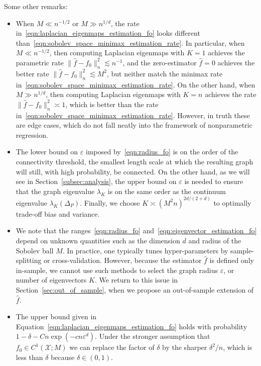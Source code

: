\documentclass{article}
\newcommand{\1}{\mathbf{1}}
\newcommand{\mc}[1]{\mathcal{#1}}
\newcommand{\wh}[1]{\widehat{#1}}
\theoremstyle{alden}
\theoremstyle{aldenthm}
\theoremstyle{definition}
\theoremstyle{remark}
\begin{document}
Some other remarks:
\begin{itemize}
	\item When $M \ll n^{-1/2}$ or $M \gg n^{1/d}$, the rate in~\eqref{eqn:laplacian_eigenmaps_estimation_fo} looks different than~\eqref{eqn:sobolev_space_minimax_estimation_rate}. In particular, when $M \ll n^{-1/2}$, then computing Laplacian eigenmaps with $K = 1$ achieves the parametric rate $\|\wh{f} - f_0\|_n^2 \lesssim n^{-1}$, and the zero-estimator $\wh{f} = 0$ achieves the better rate $\|\wh{f} - f_0\|_n^2 \lesssim M^2$, but neither match the minimax rate in~\eqref{eqn:sobolev_space_minimax_estimation_rate}. On the other hand, when $M \gg n^{1/d}$, then computing Laplacian eigenmaps with $K = n$ achieves the rate $\|\wh{f} - f_0\|_n^2 \asymp 1$, which is better than the rate in~\eqref{eqn:sobolev_space_minimax_estimation_rate}. However, in truth these are edge cases, which do not fall neatly into the framework of nonparametric regression.
	\item The lower bound on $\varepsilon$ imposed by~\eqref{eqn:radius_fo} is on the order of the connectivity threshold, the smallest length scale at which the resulting graph will still, with high probability, be connected. On the other hand, as we will see in Section~\ref{subsec:analysis}, the upper bound on $\varepsilon$ is needed to ensure that the graph eigenvalue $\lambda_K$ is on the same order as the continuum eigenvalue $\lambda_K(\Delta_P)$. Finally, we choose $K \asymp (M^2n)^{2d/(2 + d)}$ to optimally trade-off bias and variance.
	\item We note that the ranges~\eqref{eqn:radius_fo} and~\eqref{eqn:eigenvector_estimation_fo} depend on unknown quantities such as the dimension $d$ and radius of the Sobolev ball $M$. In practice, one typically tunes hyper-parameters by sample-splitting or cross-validation. However, because the estimator $\wh{f}$ is defined only in-sample, we cannot use such methods to select the graph radius $\varepsilon$, or number of eigenvectors $K$. We return to this issue in Section~\ref{sec:out_of_sample}, when we propose an out-of-sample extension of $\wh{f}$.
	\item The upper bound given in Equation~\eqref{eqn:laplacian_eigenmaps_estimation_fo} holds with probability $1 - \delta - Cn\exp(-cn\varepsilon^d)$. Under the stronger assumption that $f_0 \in C^1(\mc{X};M)$ we can replace the factor of $\delta$ by the sharper $\delta^2/n$, which is less than $\delta$ because $\delta \in (0,1)$. 
\end{itemize}
\end{document}
